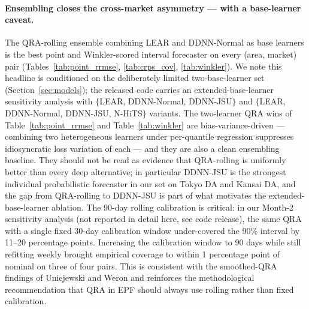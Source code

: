 \documentclass[review,3p,times,authoryear]{elsarticle}
\begin{document}
\paragraph{Ensembling closes the cross-market asymmetry --- with a base-learner caveat.}
The QRA-rolling ensemble combining LEAR and DDNN-Normal as base learners is the best point and Winkler-scored interval forecaster on every (area, market) pair (Tables~\ref{tab:point_rrmse}, \ref{tab:crps_cov}, \ref{tab:winkler}). We note this headline is conditioned on the deliberately limited two-base-learner set (Section~\ref{sec:models}); the released code carries an extended-base-learner sensitivity analysis with \(\{\)LEAR, DDNN-Normal, DDNN-JSU\(\}\) and \(\{\)LEAR, DDNN-Normal, DDNN-JSU, N-HiTS\(\}\) variants. The two-learner QRA wins of Table~\ref{tab:point_rrmse} and Table~\ref{tab:winkler} are bias-variance-driven --- combining two heterogeneous learners under per-quantile regression suppresses idiosyncratic loss variation of each --- and they are also a clean ensembling baseline. They should not be read as evidence that QRA-rolling is uniformly better than every deep alternative; in particular DDNN-JSU is the strongest individual probabilistic forecaster in our set on Tokyo DA and Kansai DA, and the gap from QRA-rolling to DDNN-JSU is part of what motivates the extended-base-learner ablation. The 90-day rolling calibration is critical: in our Month-2 sensitivity analysis (not reported in detail here, see code release), the same QRA with a single fixed 30-day calibration window under-covered the 90\% interval by 11--20 percentage points. Increasing the calibration window to 90 days while still refitting weekly brought empirical coverage to within 1 percentage point of nominal on three of four pairs. This is consistent with the smoothed-QRA findings of Uniejewski and Weron \citep{uniejewski2021} and reinforces the methodological recommendation that QRA in EPF should always use rolling rather than fixed calibration.
\end{document}
